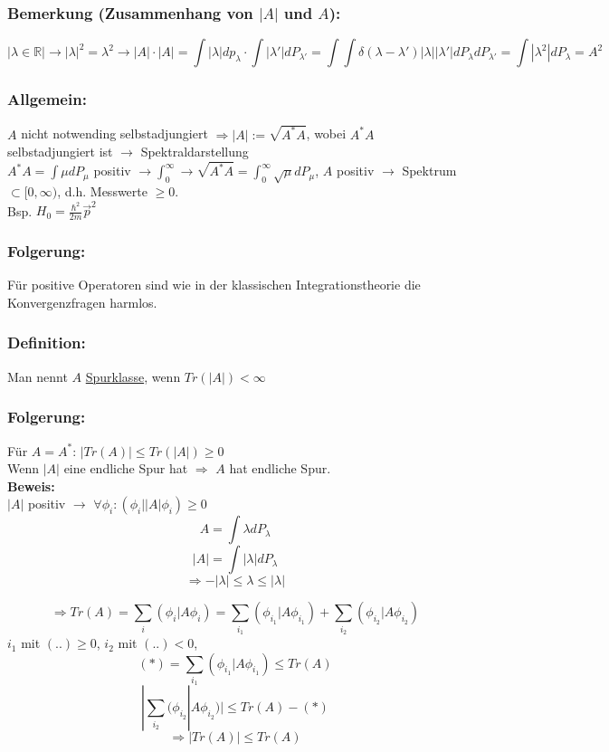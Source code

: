 \documentclass[twoside,a4paper]{scrartcl}
\newcommand{\R}{\mathbb{R}}
\renewcommand{\1}{\mathds{1}}
\newcommand{\Ra}{\Rightarrow}
\newcommand{\ra}{\rightarrow}
\renewcommand{\l}{\lambda}
\renewcommand{\R}{\mathbb{R}}
\begin{document}
\subsubsection*{Bemerkung (Zusammenhang von $|A|$ und $A$):}
$$|\l \in \R| \ra |\l|^2=\l^2 \ra |A| \cdot |A|=\int |\l| dp_\l \cdot \int |\l'|dP_{\l'}=\int \int \delta(\l-\l') |\l||\l'|dP_\l dP_{\l'}=\int |\l^2|dP_\l=A^2$$
\subsubsection*{Allgemein:}
$A$ nicht notwending selbstadjungiert $\Ra |A|:= \sqrt{A^*A}$, wobei $A^*A$ selbstadjungiert ist $\ra$ Spektraldarstellung\\
$A^*A=\int \mu dP_\mu$ positiv $\ra \int_0^\infty \ra \sqrt{A^*A}=\int_0^\infty \sqrt{\mu}dP_\mu$, $A$ positiv $\ra$ Spektrum $\subset [0,\infty)$, d.h. Messwerte $\geq 0$.\\
Bsp. $H_0=\frac{\hbar^2}{2m}\vec p^2$

\subsubsection*{Folgerung:}
Für positive Operatoren sind wie in der klassischen Integrationstheorie die Konvergenzfragen harmlos.

\subsubsection*{Definition:}
Man nennt $A$ \underline{Spurklasse}, wenn $Tr(|A|)< \infty$

\subsubsection*{Folgerung:}

Für $A=A^*$: $|Tr(A)| \leq Tr(|A|) \geq 0$\\
Wenn $|A|$ eine endliche Spur hat $\Ra$ $A$ hat endliche Spur.\\

\textbf{Beweis:}\\
$|A|$ positiv $\ra$ $\forall \phi_i: (\phi_i| |A| \phi_i)\geq 0$\\
$$A=\int \l dP_\l$$
$$|A|=\int |\l| dP_\l$$
$$\Ra -|\l| \leq \l \leq |\l|$$

$$\Ra Tr(A)=\sum_i (\phi_i|A\phi_i)=\sum_{i_1}(\phi_{i_1}|A\phi_{i_1})+\sum_{i_2}(\phi_{i_2}|A\phi_{i_2})$$
$i_1$ mit $(..)\geq 0$, $i_2$ mit $(..)< 0$, 
$$(*)=\sum_{i_1}(\phi_{i_1}|A\phi_{i_1}) \leq Tr(A)$$
$$|\sum_{i_2}(\phi_{i_2}|A\phi_{i_2})| \leq Tr(A)-(*)$$
$$\Ra |Tr(A)| \leq Tr(A)$$
\end{document}
